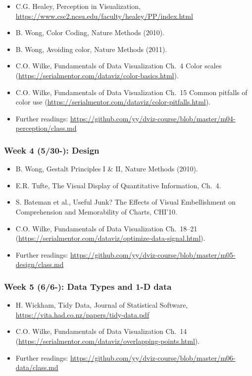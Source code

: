 \begin{itemize}\itemsep0em 
\item C.G. Healey, Perception in Visualization, \url{https://www.csc2.ncsu.edu/faculty/healey/PP/index.html}
\item B. Wong, Color Coding, Nature Methods (2010).
\item B. Wong, Avoiding color, Nature Methods (2011). 
\item C.O. Wilke, Fundamentals of Data Visualization Ch.~4 Color scales (\url{https://serialmentor.com/dataviz/color-basics.html}). 
\item C.O. Wilke, Fundamentals of Data Visualization Ch.~15 Common pitfalls of color use (\url{https://serialmentor.com/dataviz/color-pitfalls.html}).
\item Further readings: \url{https://github.com/yy/dviz-course/blob/master/m04-perception/class.md}
\end{itemize}	
\subsubsection{Week 4 (5/30-): Design }%

\begin{itemize}\itemsep0em 
\item B. Wong, Gestalt Principles I \& II, Nature Methods (2010). 
\item E.R. Tufte, The Visual Display of Quantitative Information, Ch.~4.
\item S. Bateman et al., Useful Junk? The Effects of Visual Embellishment on Comprehension and Memorability of Charts, CHI'10.
\item C.O. Wilke, Fundamentals of Data Visualization Ch.~18--21 (\url{https://serialmentor.com/dataviz/optimize-data-signal.html}). 
\item Further readings: \url{https://github.com/yy/dviz-course/blob/master/m05-design/class.md}
\end{itemize}	
\subsubsection{Week 5 (6/6-): Data Types and 1-D data } %

\begin{itemize}\itemsep0em 
\item H. Wickham, Tidy Data, Journal of Statistical Software, \url{https://vita.had.co.nz/papers/tidy-data.pdf}
\item C.O. Wilke, Fundamentals of Data Visualization Ch.~14 (\url{https://serialmentor.com/dataviz/overlapping-points.html}). 
\item Further readings: \url{https://github.com/yy/dviz-course/blob/master/m06-data/class.md}
\end{itemize}	
